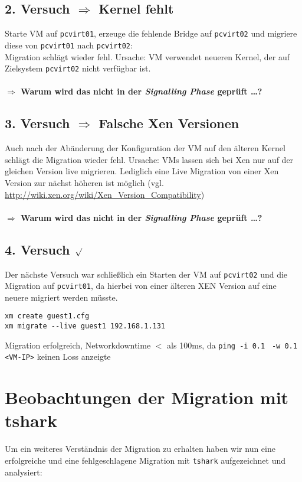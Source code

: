 \subsection {2. Versuch $\Rightarrow$ Kernel fehlt}
Starte VM auf \verb#pcvirt01#, erzeuge die fehlende Bridge auf \verb#pcvirt02# und migriere diese von \verb#pcvirt01# nach \verb#pcvirt02#:
\\
Migration schlägt wieder fehl. Ursache: VM verwendet neueren Kernel, der auf Zielsystem \verb#pcvirt02# nicht verfügbar ist.
\\
\\
\large
\textbf{$\Rightarrow$ Warum wird das nicht in der \emph{Signalling Phase} geprüft \dots?}
\normalsize

\subsection {3. Versuch $\Rightarrow$ Falsche Xen Versionen}
Auch nach der Abänderung der Konfiguration der VM auf den älteren Kernel schlägt die Migration wieder fehl. Ursache: VMs lassen sich bei Xen nur auf der gleichen Version live migrieren. Lediglich eine Live Migration von einer Xen Version zur nächst höheren ist möglich (vgl. \url{http://wiki.xen.org/wiki/Xen_Version_Compatibility})
\\
\\
\Large
\textbf{$\Rightarrow$ Warum wird das nicht in der \emph{Signalling Phase} geprüft \dots?}
\normalsize

\subsection {4. Versuch $\surd$ }
Der nächste Versuch war schließlich ein Starten der VM auf \verb#pcvirt02# und die Migration auf \verb#pcvirt01#, da hierbei von einer älteren XEN Version auf eine neuere migriert werden müsste.
\setupVerbatimOut
\begin{verbatim} 
xm create guest1.cfg
xm migrate --live guest1 192.168.1.131
\end{verbatim}

Migration erfolgreich, Networkdowntime $<$ als 100ms, da \verb|ping -i 0.1| \verb| -w 0.1 <VM-IP>| keinen Loss anzeigte

\section{Beobachtungen der Migration mit tshark}
Um ein weiteres Verständnis der Migration zu erhalten haben wir nun eine erfolgreiche und eine fehlgeschlagene Migration mit \verb#tshark# aufgezeichnet und analysiert:

